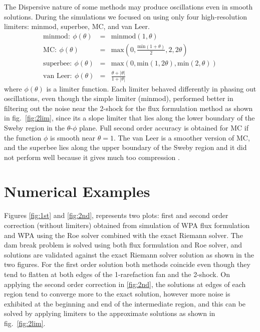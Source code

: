 \documentclass[12pt,a4paper]{article}
\begin{document}
	The Dispersive nature of some methods may produce oscillations even in smooth solutions. During the simulations we focused on using only  four high-resolution limiters: minmod, superbee, MC, and van Leer.
	\begin{eqnarray}
		\text{minmod} :~ \phi(\theta) &=& \text{minmod}(1,\theta)\\
		\text{MC} : ~ \phi(\theta) &=& \text{max} \left(0,\frac{\text{min}(1 + \theta)}{2},2,2\theta \right)\\
		\text{superbee}: ~ \phi(\theta) &=& \text{max}(0,\text{min}(1,2\theta),\text{min}(2,\theta))\\
		\text{van Leer} : ~ \phi(\theta) &=& \frac{\theta + |\theta|}{1 + |\theta|}
	\end{eqnarray}
	where $\phi(\theta)$ is a limiter function. Each limiter behaved differently in phasing out oscillations, even though the simple limiter (minmod), performed better  in filtering out the noise near the 2-shock for the flux formulation method as shown in fig.~\ref*{fig:2lim}, since its a slope limiter that lies along the lower boundary of the Sweby region in the $\theta$-$\phi$  plane. Full second order accuracy is obtained for MC if the function $\phi$ is smooth near $\theta=1$. The van Leer is a smoother version of MC, and the superbee lies along the upper boundary of the Sweby region and it did not perform well because it gives much too compression  \cite{ma-ah-be-ca-ge-ha-ke-le-le:2016}.\\
	\section{Numerical Examples}
	
	Figures \ref{fig:1st} and  \ref{fig:2nd}, represents two plots: first  and second order correction (without limiters) obtained from simulation of WPA flux formulation and WPA using the Roe solver combined with the exact Riemann solver. The dam break problem is solved using both flux formulation and  Roe solver, and  solutions are validated against the exact Riemann solver solution as shown in the two figures. For the first order solution both methods coincide even though they tend to flatten at both edges of the 1-rarefaction fan and the 2-shock. On applying the second order correction in  \ref{fig:2nd}, the solutions at edges of each region tend to converge more to the exact solution, however more noise is exhibited at the beginning and end of the intermediate region, and this can be solved by applying limiters to the approximate solutions as shown in fig.~\ref{fig:2lim}. \\
	
\end{document}
